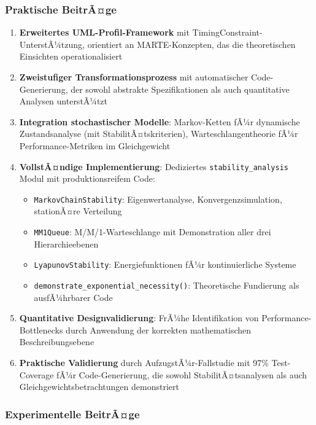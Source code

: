 ﻿\documentclass[a4paper,12pt]{scrreprt}
\theoremstyle{definition}
\begin{document}
\subsubsection{Praktische BeitrÃ¤ge}

\begin{enumerate}
	\item[-] \textbf{Erweitertes UML-Profil-Framework} mit TimingConstraint-UnterstÃ¼tzung, orientiert an MARTE-Konzepten, das die theoretischen Einsichten operationalisiert
	
	\item[-] \textbf{Zweistufiger Transformationsprozess} mit automatischer Code-Generierung, der sowohl abstrakte Spezifikationen als auch quantitative Analysen unterstÃ¼tzt
	
	\item[-] \textbf{Integration stochastischer Modelle}: Markov-Ketten fÃ¼r dynamische Zustandsanalyse (mit StabilitÃ¤tskriterien), Warteschlangentheorie fÃ¼r Performance-Metriken im Gleichgewicht
	
	\item[-] \textbf{VollstÃ¤ndige Implementierung}: Dediziertes \texttt{stability\_analysis} Modul mit produktionsreifem Code:
	\begin{itemize}
		\item[-] \texttt{MarkovChainStability}: Eigenwertanalyse, Konvergenzsimulation, stationÃ¤re Verteilung
		\item[-] \texttt{MM1Queue}: M/M/1-Warteschlange mit Demonstration aller drei Hierarchieebenen
		\item[-] \texttt{LyapunovStability}: Energiefunktionen fÃ¼r kontinuierliche Systeme
		\item[-] \texttt{demonstrate\_exponential\_necessity()}: Theoretische Fundierung als ausfÃ¼hrbarer Code
	\end{itemize}
	
	\item[-] \textbf{Quantitative Designvalidierung}: FrÃ¼he Identifikation von Performance-Bottle\-necks durch Anwendung der korrekten mathematischen Beschreibungsebene
	
	\item[-] \textbf{Praktische Validierung} durch AufzugstÃ¼r-Fallstudie mit 97\% Test-Coverage fÃ¼r Code-Generierung, die sowohl StabilitÃ¤tsanalysen als auch Gleichgewichtsbetrachtungen demonstriert
\end{enumerate}

\subsubsection{Experimentelle BeitrÃ¤ge}
\end{document}
